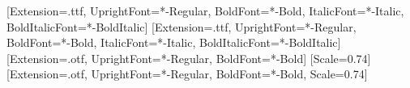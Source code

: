 \usepackage{amsmath,amsthm, amssymb, latexsym}
\usepackage{mathspec}
\setmainfont{Roboto}[Extension=.ttf, UprightFont=*-Regular, BoldFont=*-Bold,
  ItalicFont=*-Italic, BoldItalicFont=*-BoldItalic]
\setsansfont{Roboto}[Extension=.ttf, UprightFont=*-Regular, BoldFont=*-Bold,
  ItalicFont=*-Italic, BoldItalicFont=*-BoldItalic]
\setfontfamily{}[Extension=.otf, UprightFont=*-Regular, BoldFont=*-Bold]
  {\setmonofont{Fira Code}[Scale=0.74]}
  {\setmonofont{FiraMono}[Extension=.otf, UprightFont=*-Regular, BoldFont=*-Bold, Scale=0.74]}

\usepackage{graphicx}
\usepackage{booktabs}
\usepackage{colortbl}
\usepackage{qrcode}
\usepackage{adjustbox}
\usepackage{xspace}
\usepackage{nicefrac}
\usepackage{multiobjective}
\usepackage{setspace}
\usepackage{multicol}

\usepackage{tikz}
\usetikzlibrary{calc, backgrounds, arrows, arrows.meta, shapes, positioning, fit}
